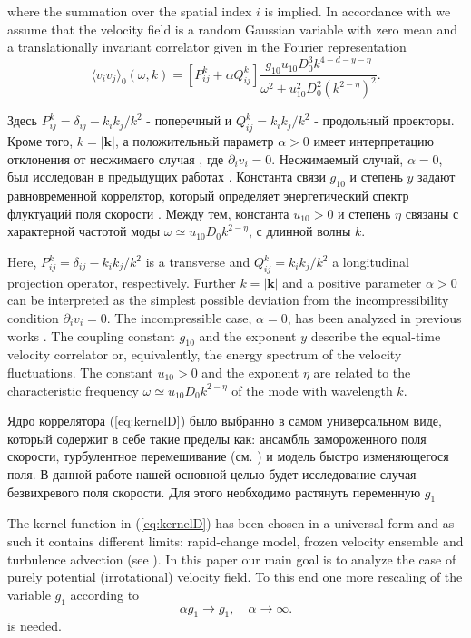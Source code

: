 \documentclass[12pt]{article}
\def\mk{{\bm k}}
\begin{document}
where the summation over the spatial index $i$ is implied.
 In accordance with \cite{Ant99,Ant00} we assume that
 the velocity field is a random Gaussian variable with zero mean and 
 a translationally invariant correlator \cite{Ant00} given
 in the Fourier representation 
\begin{equation}
  \langle v_i v_j \rangle_0 (\omega,k)
  = [P_{ij}^{k} + \alpha Q_{ij}^{k}]
  \frac{g_{10} u_{10} D_0^3 k^{4-d-y-\eta}}{\omega^2 + u_{10}^2 D_0^2 (k^{2-\eta})^2}.
  \label{eq:kernelD}
\end{equation}

Здесь $P_{ij}^k = \delta_{ij}-k_ik_j/k^2$ - поперечный и $Q_{ij}^k=k_ik_j/k^2$ - продольный проекторы.
Кроме того, $k=|\mk|$, а положительный параметр $\alpha>0$ имеет интерпретацию отклонения от несжимаего случая \cite{AdzAnt98}, где $\partial_i v_i = 0$.
Несжимаемый случай, $\alpha=0$, был исследован в предыдущих работах \cite{AntKap08,Ant11,DP13}. 
Константа связи $g_{10}$ и степень $y$ задают равновременной коррелятор, который определяет энергетический спектр флуктуаций поля скорости \cite{Ant99,Ant00,Frisch}.
Между тем, константа $u_{10}>0$ и степень $\eta$ связаны с характерной частотой моды $\omega \simeq u_{10} D_0 k^{2-\eta}$, с длинной волны $k$.

Here, $P_{ij}^k = \delta_{ij}-k_ik_j/k^2$ is a transverse  and $Q_{ij}^k=k_ik_j/k^2$ a longitudinal
projection
operator, respectively. Further $k=|\mk|$ and a positive parameter $\alpha>0$ can be interpreted as the simplest possible
deviation \cite{AdzAnt98} from the incompressibility condition
$\partial_i v_i = 0$.
The incompressible case, $\alpha=0$, has been analyzed in previous 
works \cite{AntKap08,Ant11,DP13}.
The coupling constant $g_{10}$ and the exponent $y$ describe the equal-time velocity
correlator or, equivalently, the energy spectrum \cite{Ant99,Ant00,Frisch} of the velocity
fluctuations. The constant $u_{10}>0$ and the exponent $\eta$ are related
to the characteristic frequency $\omega \simeq u_{10} D_0 k^{2-\eta}$ of the mode with
wavelength $k$.

Ядро коррелятора (\ref{eq:kernelD}) было выбранно в самом универсальном виде, который содержит в себе такие пределы как: ансамбль замороженного поля скорости, турбулентное перемешивание (см. \cite{Ant99,Ant00}) и модель быстро изменяющегося поля.
В данной работе нашей основной целью будет исследование случая безвихревого поля скорости. Для этого необходимо растянуть переменную  $g_1$

The kernel function in (\ref{eq:kernelD}) has been chosen in a universal
 form
 and as such it contains different limits: rapid-change model, frozen
 velocity ensemble and turbulence advection (see \cite{Ant99,Ant00}).
 In this paper our main goal is to analyze the case
 of purely potential (irrotational) velocity field.
To this end one more rescaling of the variable $g_1$ according to
\begin{equation}
   \alpha g_1 \rightarrow g_1, \quad \alpha\rightarrow\infty.
   \label{eq:rescale}
\end{equation}
is needed.
\end{document}
